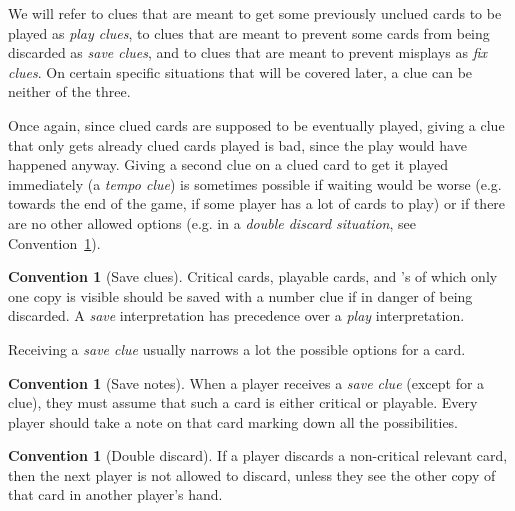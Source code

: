 \documentclass[a4paper]{article}
\theoremstyle{plain}
\theoremstyle{definition}
\newtheorem{convention}[theorem]{Convention}
\begin{document}
We will refer to clues that are meant to get some previously unclued cards to be played as \emph{play clues}, to clues that are meant to prevent some cards from being discarded as \emph{save clues}, and to clues that are meant to prevent misplays as \emph{fix clues}. On certain specific situations that will be covered later, a clue can be neither of the three.

Once again, since clued cards are supposed to be eventually played, giving a clue that only gets already clued cards played is bad, since the play would have happened anyway. Giving a second clue on a clued card to get it played immediately (a \emph{tempo clue}) is sometimes possible if waiting would be worse (e.g. towards the end of the game, if some player has a lot of cards to play) or if there are no other allowed options (e.g. in a \emph{double discard situation}, see Convention~\ref{double-discard}).

\begin{convention}[Save clues]
	Critical cards, playable cards, and 's of which only one copy is visible should be saved with a number clue if in danger of being discarded. A \emph{save} interpretation has precedence over a \emph{play} interpretation.
\end{convention}

Receiving a \emph{save clue} usually narrows a lot the possible options for a card.

\begin{convention}[Save notes]
	\label{save-notes}
	When a player receives a \emph{save clue} (except for a  clue), they must assume that such a card is either critical or playable. Every player should take a note on that card marking down all the possibilities.
\end{convention}


\begin{convention}[Double discard]
	\label{double-discard}
	If a player discards a non-critical relevant card, then the next player is not allowed to discard, unless they see the other copy of that card in another player's hand.
\end{convention}
\end{document}
